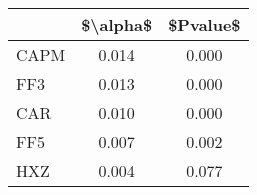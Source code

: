\begin{tabular}{lcc}
\toprule
{} &  \$\textbackslash alpha\$ &  \$Pvalue\$ \\
\midrule
CAPM &     0.014 &     0.000 \\
FF3  &     0.013 &     0.000 \\
CAR  &     0.010 &     0.000 \\
FF5  &     0.007 &     0.002 \\
HXZ  &     0.004 &     0.077 \\
\bottomrule
\end{tabular}
